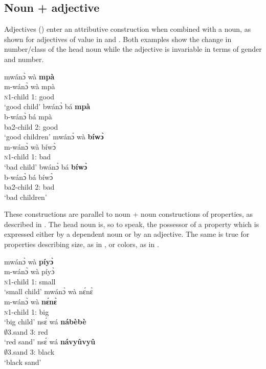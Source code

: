 \subsection{Noun + adjective}
\label{sec:NQUAL}

Adjectives () enter an attributive construction when combined with a noun, as shown for adjectives of value in  and . Both examples show the change in number/class of the head noun while the adjective is invariable in terms of gender and number.

\ea\label{goodchild}
\ea\label{goodchild1}
 \glll mwánɔ̀ wà {\bfseries mpà} \\
 m-wánɔ̀ wà mpà \\
          \textsc{n}1-child 1:{\ATT} good  \\
    \trans `good child'
\ex \label{goodchild2}
  \glll    bwánɔ̀ bá {\bfseries mpà} \\
  b-wánɔ̀ bá mpà \\
              ba2-child 2:{\ATT} good \\
    \trans `good children'
\z
\ex\label{badchild}
\ea\label{badchild1}
 \glll  mwánɔ̀ wà {\bfseries bíwɔ̀} \\
 m-wánɔ̀ wà bíwɔ̀ \\
          \textsc{n}1-child 1:{\ATT} bad  \\
    \trans `bad child'
\ex \label{badchild2}
  \glll    bwánɔ̀ bá {\bfseries bíwɔ̀} \\
  b-wánɔ̀ bá bíwɔ̀ \\
              ba2-child 2:{\ATT} bad \\
    \trans `bad children'
\z
\z

\noindent These constructions are parallel to noun + noun constructions of properties, as described in . The head noun is, so to speak, the possessor of a property which is expressed either by a dependent noun or by an adjective. 
The same is true for properties describing size, as in , or colors, as in .

\ea\label{propsize}
\ea\label{propsize1}
 \glll  mwánɔ̀ wà {\bfseries píyɔ̀} \\
 m-wánɔ̀ wà píyɔ̀ \\
          \textsc{n}1-child 1:{\ATT} small  \\
    \trans `small child'
\ex \label{propsize2}
  \glll    mwánɔ̀ wà nɛ́nɛ̀ \\
  m-wánɔ̀ wà {\bfseries nɛ́nɛ̀} \\
              \textsc{n}1-child 1:{\ATT} big \\
    \trans `big child'
\z
\ex\label{propcolors}
\ea\label{propcolors1}
 \gll  nsɛ́ wá {\bfseries nábèbè} \\
          $\emptyset$3.sand 3:{\ATT} red  \\
    \trans `red sand'
\ex \label{propcolors2}
  \gll    nsɛ́ wá {\bfseries návyûvyû} \\
              $\emptyset$3.sand 3:{\ATT} black \\
    \trans `black sand'
\z
\z


